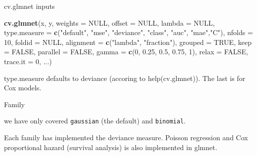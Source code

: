 \documentclass[
  ignorenonframetext,
]{beamer}
\newenvironment{Shaded}{\begin{snugshade}}{\end{snugshade}}
\newcommand{\DataTypeTok}[1]{\textcolor[rgb]{0.13,0.29,0.53}{#1}}
\newcommand{\DecValTok}[1]{\textcolor[rgb]{0.00,0.00,0.81}{#1}}
\newcommand{\FloatTok}[1]{\textcolor[rgb]{0.00,0.00,0.81}{#1}}
\newcommand{\KeywordTok}[1]{\textcolor[rgb]{0.13,0.29,0.53}{\textbf{#1}}}
\newcommand{\NormalTok}[1]{#1}
\newcommand{\OtherTok}[1]{\textcolor[rgb]{0.56,0.35,0.01}{#1}}
\newcommand{\StringTok}[1]{\textcolor[rgb]{0.31,0.60,0.02}{#1}}
\begin{document}
\begin{frame}[fragile]

\begin{block}{cv.glmnet inputs}

\begin{Shaded}
\begin{Highlighting}[]
\KeywordTok{cv.glmnet}\NormalTok{(x, y, }\DataTypeTok{weights =} \OtherTok{NULL}\NormalTok{, }\DataTypeTok{offset =} \OtherTok{NULL}\NormalTok{, }\DataTypeTok{lambda =} \OtherTok{NULL}\NormalTok{,}
  \DataTypeTok{type.measure =} \KeywordTok{c}\NormalTok{(}\StringTok{"default"}\NormalTok{, }\StringTok{"mse"}\NormalTok{, }\StringTok{"deviance"}\NormalTok{, }\StringTok{"class"}\NormalTok{, }\StringTok{"auc"}\NormalTok{, }\StringTok{"mae"}\NormalTok{,}\StringTok{"C"}\NormalTok{),}
  \DataTypeTok{nfolds =} \DecValTok{10}\NormalTok{, }\DataTypeTok{foldid =} \OtherTok{NULL}\NormalTok{, }
  \DataTypeTok{alignment =} \KeywordTok{c}\NormalTok{(}\StringTok{"lambda"}\NormalTok{, }\StringTok{"fraction"}\NormalTok{), }\DataTypeTok{grouped =} \OtherTok{TRUE}\NormalTok{, }
  \DataTypeTok{keep =} \OtherTok{FALSE}\NormalTok{, }\DataTypeTok{parallel =} \OtherTok{FALSE}\NormalTok{,}
  \DataTypeTok{gamma =} \KeywordTok{c}\NormalTok{(}\DecValTok{0}\NormalTok{, }\FloatTok{0.25}\NormalTok{, }\FloatTok{0.5}\NormalTok{, }\FloatTok{0.75}\NormalTok{, }\DecValTok{1}\NormalTok{), }\DataTypeTok{relax =} \OtherTok{FALSE}\NormalTok{, }\DataTypeTok{trace.it =} \DecValTok{0}\NormalTok{, ...)}
\end{Highlighting}
\end{Shaded}

type.measure defaults to deviance (accoring to help(cv.glmnet)). The
last is for Cox models.

\end{block}

\end{frame}

\begin{frame}[fragile]

\begin{block}{Family}

we have only covered \texttt{gaussian} (the default) and
\texttt{binomial}.

Each family has implemented the deviance measure. Poisson regression and
Cox proportional hazard (survival analysis) is also implemented in
glmnet.

\end{block}

\end{frame}
\end{document}
